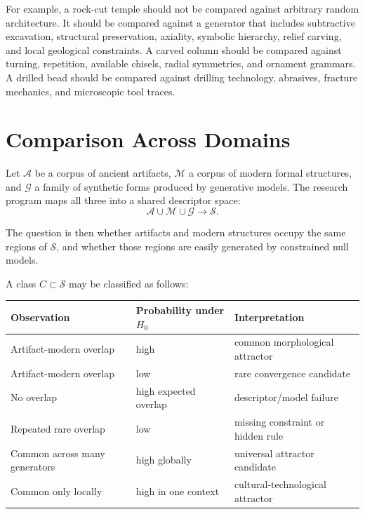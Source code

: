 For example, a rock-cut temple should not be compared against arbitrary random architecture. It should be compared against a generator that includes subtractive excavation, structural preservation, axiality, symbolic hierarchy, relief carving, and local geological constraints. A carved column should be compared against turning, repetition, available chisels, radial symmetries, and ornament grammars. A drilled bead should be compared against drilling technology, abrasives, fracture mechanics, and microscopic tool traces.

\section{Comparison Across Domains}

Let $\mathcal{A}$ be a corpus of ancient artifacts, $\mathcal{M}$ a corpus of modern formal structures, and $\mathcal{G}$ a family of synthetic forms produced by generative models. The research program maps all three into a shared descriptor space:
\begin{equation}
    \mathcal{A}\cup\mathcal{M}\cup\mathcal{G}\longrightarrow \mathcal{S}.
\end{equation}

The question is then whether artifacts and modern structures occupy the same regions of $\mathcal{S}$, and whether those regions are easily generated by constrained null models.

A class $C\subset\mathcal{S}$ may be classified as follows:
\begin{center}
\begin{tabular}{p{3.8cm}p{3.6cm}p{4.6cm}}
\toprule
Observation & Probability under $H_0$ & Interpretation \\
\midrule
Artifact-modern overlap & high & common morphological attractor \\
Artifact-modern overlap & low & rare convergence candidate \\
No overlap & high expected overlap & descriptor/model failure \\
Repeated rare overlap & low & missing constraint or hidden rule \\
Common across many generators & high globally & universal attractor candidate \\
Common only locally & high in one context & cultural-technological attractor \\
\bottomrule
\end{tabular}
\end{center}

